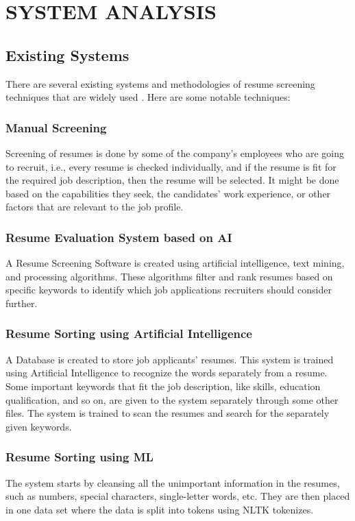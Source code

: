 \documentclass[12 pt, oneside]{book}
\begin{document}
\chapter{SYSTEM ANALYSIS} %
\section{Existing Systems}
There are several existing systems and methodologies of resume screening techniques that are widely used . Here are some notable techniques:

\subsection{ Manual Screening}Screening of resumes is done by some of the company's employees who are going to recruit, i.e., every resume is checked individually, and if the resume is fit for the required job description, then the resume will be selected. It might be done based on the capabilities they seek, the
candidates' work experience, or other factors that are relevant
to the job profile.

\subsection {Resume Evaluation System based on AI}A Resume Screening Software is created using artificial intelligence, text mining, and processing algorithms. These algorithms filter and rank resumes based on specific keywords to identify which job applications recruiters should consider further.


\subsection{Resume Sorting using Artificial Intelligence} A Database is created to store job applicants' resumes. This system is trained using Artificial Intelligence to recognize the words separately from a resume. Some important keywords that fit the job description, like skills, education qualification, and so on, are given to the system separately through some other files. The system is trained to scan the resumes and search for the separately given keywords. 

\subsection{Resume Sorting using ML} The system
starts by cleansing all the unimportant information in the
resumes, such as numbers, special characters, single-letter
words, etc. They are then placed in one data set where the
data is split into tokens using NLTK tokenizes.
\end{document}
